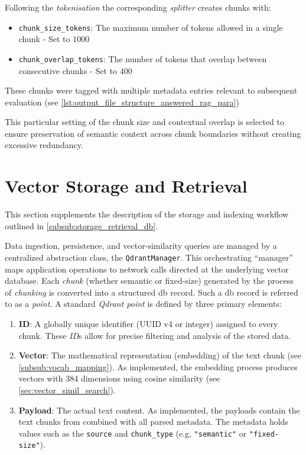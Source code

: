 Following the \textit{tokenisation} the corresponding \textit{splitter} creates chunks with:
\begin{itemize}
    \item \texttt{chunk\_size\_tokens}: The maximum number of tokens allowed in a single chunk - Set to $1000$
    \item \texttt{chunk\_overlap\_tokens}: The number of tokens that overlap between consecutive chunks - Set to $400$
\end{itemize}
These chunks were tagged with multiple metadata entries relevant to subsequent evaluation (see \cref{lst:output_file_structure_answered_rag_para})

This particular setting of the chunk size and contextual overlap is selected to ensure preservation of semantic context across chunk boundaries without creating excessive redundancy.

\section*{Vector Storage and Retrieval}\label{app:vector_storage_sretrieval}
This section supplements the description of the storage and indexing workflow outlined in \cref{subsub:storage_retrieval_db}.

Data ingestion, persistence, and vector-similarity queries are managed by a centralized abstraction class, the \texttt{QdrantManager}.
This orchestrating \enquote{manager} maps application operations to network calls directed at the underlying vector database.
Each \textit{chunk} (whether semantic or fixed-size) generated by the process of \textit{chunking} is converted into a structured \ac{db} record.
Such a \ac{db} record is referred to as a \textit{point}.
A standard \textit{Qdrant point} is defined by three primary elements:
\begin{enumerate}
    \item \textbf{ID}: A globally unique identifier (UUID v4 or integer) assigned to every chunk.
    These \textit{ID}s allow for precise filtering and analysis of the stored data.
    \item \textbf{Vector}: The mathematical representation (embedding) of the text chunk (see \cref{subsub:vocab_mapping}).
    As implemented, the embedding process produces vectors with $384$ dimensions using cosine similarity (see \cref{sec:vector_simil_search}).
    \item \textbf{Payload}: The actual text content.
    As implemented, the payloads contain the text chunks from \citet{bb2} combined with all parsed metadata.
    The metadata holds values such as the \texttt{source} and \texttt{chunk\_type} (e.g, \texttt{"semantic"} or \texttt{"fixed-size"}).
\end{enumerate}

